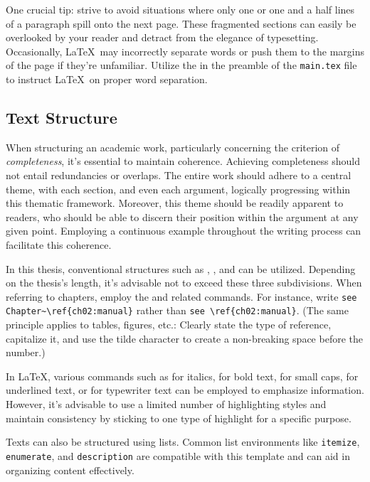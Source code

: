 \documentclass[
    language=german, %
    thesis=bachelor, %
    supervisor=postdoc, %
    multiauthor=false, %
    ]{settings/csssa-thesis}
\begin{document}
One crucial tip: strive to avoid situations where only one or one and a half lines of a paragraph spill onto the next page. These fragmented sections can easily be overlooked by your reader and detract from the elegance of typesetting. Occasionally, \LaTeX\ may incorrectly separate words or push them to the margins of the page if they're unfamiliar. Utilize the  in the preamble of the \texttt{main.tex} file to instruct \LaTeX\ on proper word separation.

\subsection{Text Structure}\label{ch02:sec1:structure}

When structuring an academic work, particularly concerning the criterion of \emph{completeness}, it's essential to maintain coherence. Achieving completeness should not entail redundancies or overlaps. The entire work should adhere to a central theme, with each section, and even each argument, logically progressing within this thematic framework. Moreover, this theme should be readily apparent to readers, who should be able to discern their position within the argument at any given point. Employing a continuous example throughout the writing process can facilitate this coherence.

In this thesis, conventional structures such as , , and  can be utilized. Depending on the thesis's length, it's advisable not to exceed these three subdivisions. When referring to chapters, employ the  and related  commands. For instance, write \verb|see Chapter~\ref{ch02:manual}| rather than \verb|see \ref{ch02:manual}|. (The same principle applies to tables, figures, etc.: Clearly state the type of reference, capitalize it, and use the tilde character to create a non-breaking space before the number.)

In \LaTeX, various commands such as  for italics,  for bold text,  for small caps,  for underlined text, or  for typewriter text can be employed to emphasize information. However, it's advisable to use a limited number of highlighting styles and maintain consistency by sticking to one type of highlight for a specific purpose.

Texts can also be structured using lists. Common list environments like \texttt{itemize}, \texttt{enumerate}, and \texttt{description} are compatible with this template and can aid in organizing content effectively.
\end{document}
